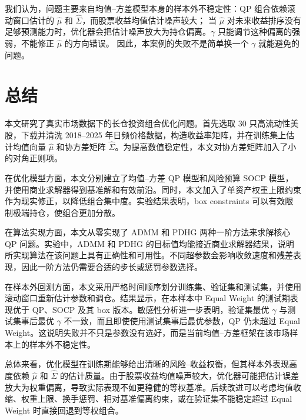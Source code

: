 \documentclass[UTF8,12pt]{ctexart}
\begin{document}
我们认为，问题主要来自均值--方差模型本身的样本外不稳定性：QP 组合依赖滚动窗口估计的 $\hat\mu$ 和 $\hat\Sigma$，而股票收益均值估计噪声较大；
当 $\hat\mu$ 对未来收益排序没有足够预测能力时，优化器会把估计噪声放大为持仓偏离。$\gamma$ 只能调节这种偏离的强弱，不能修正 $\hat\mu$ 的方向错误。
因此，本案例的失败不是简单换一个 $\gamma$ 就能避免的问题。



\section{总结}

本文研究了真实市场数据下的长仓投资组合优化问题。首先选取 30 只高流动性美股，下载并清洗 2018--2025 年日频价格数据，构造收益率矩阵，并在训练集上估计均值向量 $\hat\mu$ 和协方差矩阵 $\hat\Sigma$。为提高数值稳定性，本文对协方差矩阵加入了小的对角正则项。

在优化模型方面，本文分别建立了均值--方差 QP 模型和风险预算 SOCP 模型，并使用商业求解器得到基准解和有效前沿。同时，本文加入了单资产权重上限约束作为现实修正，以降低组合集中度。实验结果表明，box constraints 可以有效限制极端持仓，使组合更加分散。

在算法实现方面，本文从零实现了 ADMM 和 PDHG 两种一阶方法来求解核心 QP 问题。实验中，ADMM 和 PDHG 的目标值均能接近商业求解器结果，说明所实现算法在该问题上具有正确性和可用性。不同超参数会影响收敛速度和残差表现，因此一阶方法仍需要合适的步长或惩罚参数选择。

在样本外回测方面，本文采用严格时间顺序划分训练集、验证集和测试集，并使用滚动窗口重新估计参数和调仓。结果显示，在本样本中 Equal Weight 的测试期表现优于 QP、SOCP 及其 box 版本。敏感性分析进一步表明，验证集最优 $\gamma$ 与测试集事后最优 $\gamma$ 不一致，而且即使使用测试集事后最优参数，QP 仍未超过 Equal Weight。这说明失败并不只是参数没有选好，而是当前均值--方差框架在该市场样本上的样本外不稳定性。

总体来看，优化模型在训练期能够给出清晰的风险--收益权衡，但其样本外表现高度依赖 $\hat\mu$ 和 $\hat\Sigma$ 的估计质量。由于股票收益均值噪声较大，优化器可能把估计误差放大为权重偏离，导致实际表现不如更稳健的等权基准。后续改进可以考虑均值收缩、权重上限、换手惩罚、相对基准偏离约束，或在验证集不能稳定超过 Equal Weight 时直接回退到等权组合。
\end{document}
